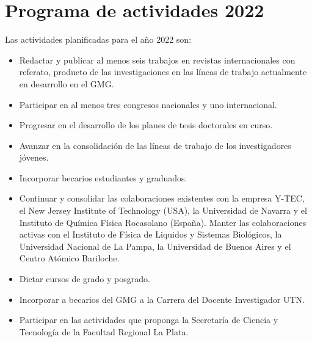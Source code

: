 \documentclass[a4paper,11pt,twoside,final,titlepage,onecolumn,openright]{report}
\begin{document}
\chapter{Programa de actividades 2022}

Las actividades planificadas para el año 2022 son:

\begin{itemize}
\item  Redactar y publicar al menos seis trabajos en revistas internacionales con referato, producto de las investigaciones en las líneas de trabajo actualmente en desarrollo en el GMG.
\item  Participar en al menos tres congresos nacionales y uno internacional. 
\item  Progresar en el desarrollo de los planes de tesis doctorales en curso.
\item  Avanzar en la consolidación de las líneas de trabajo de los investigadores jóvenes. 
\item  Incorporar becarios estudiantes y graduados. 
\item  Continuar y consolidar las colaboraciones existentes con la empresa Y-TEC, el New Jersey Institute of Technology (USA), la Universidad de Navarra y el Instituto de Química Física Rocasolano (España). Manter las colaboraciones activas con el Instituto de Física de Liquidos y Sistemas Biológicos, la Universidad Nacional de La Pampa, la Universidad de Buenos Aires y el Centro Atómico Bariloche.
\item  Dictar cursos de grado y posgrado.
\item  Incorporar a becarios del GMG a la Carrera del Docente Investigador UTN.
\item  Participar en las actividades que proponga la Secretaría de Ciencia y Tecnología de la Facultad Regional La Plata.
\end{itemize}
\end{document}

